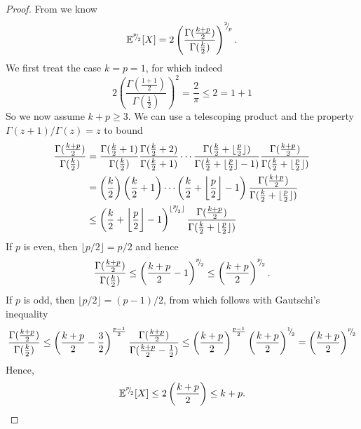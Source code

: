 \documentclass[12pt]{article}
\begin{document}
\begin{proof}
    From \cite[theorem 3.3.2]{hogg-2013-introduction-mathematical} we know
    \begin{equation}
        \mathbb{E}^{{}^{p}{\mskip -5mu/\mskip -3mu}_{2}}[X] = 2 \left( \frac{\Gamma(\frac{k + p}{2})}{\Gamma(\frac{k}{2})} \right)^{{}^{2}{\mskip -5mu/\mskip -3mu}_{p}}.
    \end{equation}
    We first treat the case $k=p=1$, for which indeed
    \begin{equation}
        2 \left( \frac{\Gamma(\frac{1+1}{2})}{\Gamma(\frac{1}{2})} \right)^2 = \frac{2}{\pi} \leq 2 = 1 + 1
    \end{equation}
    So we now assume $k + p \geq 3$. We can use a telescoping product and the property $\Gamma(z+1)/\Gamma(z) = z$ to bound
    \begin{align}
        \frac{\Gamma(\frac{k + p}{2})}{\Gamma(\frac{k}{2})} 
        &= \frac{\Gamma(\frac{k}{2} + 1)}{\Gamma(\frac{k}{2})} \frac{\Gamma(\frac{k}{2} + 2)}{\Gamma(\frac{k}{2} + 1)} \cdots \frac{\Gamma(\frac{k}{2} + \lfloor \frac{p}{2} \rfloor)}{\Gamma(\frac{k}{2} + \lfloor \frac{p}{2} \rfloor - 1)} \frac{\Gamma( \frac{k + p}{2})}{\Gamma(\frac{k}{2} + \lfloor \frac{p}{2} \rfloor)} \notag \\
        &= \left(\frac{k}{2}\right) \left(\frac{k}{2} + 1\right) \cdots \left( \frac{k}{2} + \bigg\lfloor \frac{p}{2} \bigg\rfloor - 1 \right) \frac{\Gamma( \frac{k + p}{2})}{\Gamma(\frac{k}{2} + \lfloor \frac{p}{2} \rfloor)} \notag \\
        &\leq \left(\frac{k}{2} + \bigg\lfloor \frac{p}{2} \bigg\rfloor - 1\right)^{\lfloor {}^{p}{\mskip -5mu/\mskip -3mu}_{2} \rfloor} \frac{\Gamma( \frac{k + p}{2})}{\Gamma(\frac{k}{2} + \lfloor \frac{p}{2} \rfloor)}
    \end{align}
    If $p$ is even, then $\lfloor p/2 \rfloor = p/2$ and hence
    \begin{equation}
        \frac{\Gamma(\frac{k + p}{2})}{\Gamma(\frac{k}{2})} 
        \leq \left( \frac{k + p}{2} - 1 \right)^{{}^{p}{\mskip -5mu/\mskip -3mu}_{2}}
        \leq \left( \frac{k + p}{2}\right)^{{}^{p}{\mskip -5mu/\mskip -3mu}_{2}}.
    \end{equation}
    If $p$ is odd, then $\lfloor p/2 \rfloor = (p - 1)/2$, from which follows with Gautschi's inequality \cite{kershaw-1983-extensions-gautschi}
    \begin{equation}
        \frac{\Gamma(\frac{k + p}{2})}{\Gamma(\frac{k}{2})}
        \leq \left(\frac{k + p}{2} - \frac{3}{2} \right)^{ \frac{p - 1}{2}} \frac{\Gamma( \frac{k + p}{2})}{\Gamma(\frac{k + p}{2} - \frac{1}{2})}
        \leq \left(\frac{k + p}{2}\right)^{ \frac{p - 1}{2}} \left(\frac{k + p}{2}\right)^{{}^{1}{\mskip -5mu/\mskip -3mu}_{2}}
        = \left(\frac{k + p}{2}\right)^{ {}^{p}{\mskip -5mu/\mskip -3mu}_{2}}
    \end{equation}
    Hence,
    \begin{equation}
        \mathbb{E}^{{}^{p}{\mskip -5mu/\mskip -3mu}_{2}}[X] \leq 2 \left( \frac{k + p}{2} \right) \leq k + p.
    \end{equation}
\end{proof}
\end{document}
